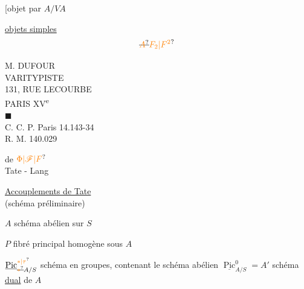 [objet   par $A/VA$

\uline{ objets  simples}
\[
\deleted{\unsure{A}}\unsure{F_2|F^2}
\]
\begin{flushright}
M. DUFOUR\\
VARITYPISTE\\
131, RUE LECOURBE\\
PARIS XV\textsuperscript{e}\\
$\blacksquare$\\
C. C. P. Paris 14.143-34\\
R. M. 140.029
\end{flushright}

\begin{flushright}
 de $\unsure{\Phi|\mathscr{F}|F}$\\
Tate - Lang
\end{flushright}

\begin{flushright}\uline{Accouplements de Tate}\\(schéma préliminaire)\end{flushright}
$A$ schéma abélien sur $S$

$P$ fibré principal homogène sous $A$

$\underline{\operatorname{Pic}}^{\unsure{*|\tau}}_{\deleted{\unsure{*}}A/S}$ schéma en groupes, contenant le schéma abélien $\underline{\operatorname{Pic}}^0_{A/S}=A'$ schéma \uline{dual} de $A$

